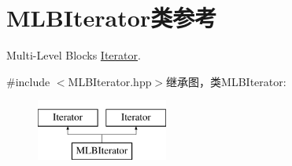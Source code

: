 \hypertarget{classMLBIterator}{
\section{MLBIterator类参考}
\label{classMLBIterator}
}


Multi-\/Level Blocks \hyperlink{classIterator}{Iterator}.  


{\ttfamily \#include $<$MLBIterator.hpp$>$}继承图，类MLBIterator:\begin{figure}[H]
\begin{center}
\leavevmode
\includegraphics[height=2cm]{classMLBIterator}
\end{center}
\end{figure}
